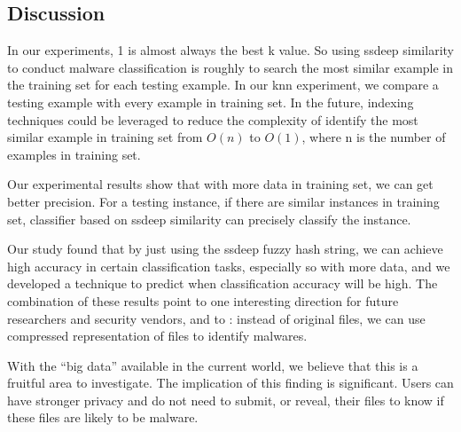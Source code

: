 
\subsection{Discussion}
In our experiments, 1 is almost always the best k value. 
So using ssdeep similarity to conduct malware classification 
is roughly to search the most similar example in the training set for each testing example.
In our knn experiment, we compare a testing example with every example in training set. 
In the future, indexing techniques could be leveraged to reduce the complexity of identify 
the most similar example in training set from $O(n)$ to $O(1)$, where n is the number of examples in training set. 

Our experimental results show that with more data in training set, 
we can get better precision. 
For a testing instance, if there are similar instances in training set, 
classifier based on ssdeep similarity can precisely classify the instance. 
\fi

Our study found that by just using the ssdeep fuzzy hash string, 
we can achieve high accuracy in certain classification tasks, especially so with more data, 
and we developed a technique to predict when classification accuracy will be high.
The combination of these results point to one interesting direction for future researchers and security vendors, and to \vt:
instead of original files, we can use compressed representation of files to identify malwares.

With the ``big data'' available in the current world, we believe that this is a fruitful area to investigate.
The implication of this finding is significant. 
Users can have stronger privacy and do not need to submit, or reveal, their files to know if these files are likely to be malware.



